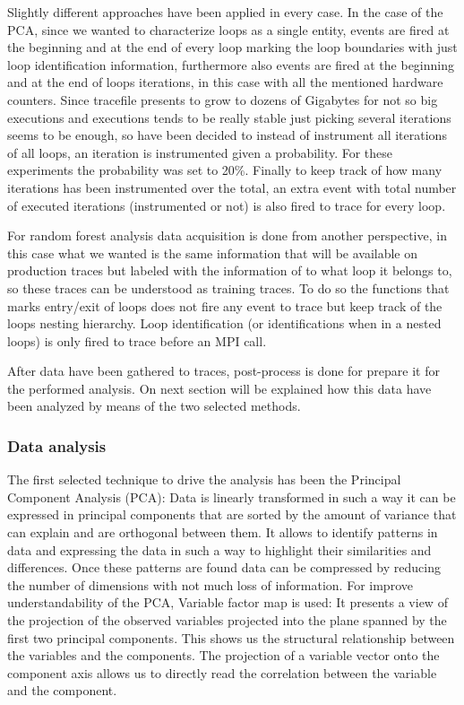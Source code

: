Slightly different approaches have been applied in every case. In the case of
the PCA, since we wanted to characterize loops as a single entity, events are
fired at the beginning and at the end of every loop marking the loop boundaries
with just loop identification information, furthermore also events are fired at 
the beginning and at the end of loops iterations, in this case with all the
mentioned hardware counters. Since tracefile presents to grow to dozens of
Gigabytes for not so big executions and executions tends to be really stable
just picking several iterations seems to be enough, so have been decided to 
instead of instrument all iterations of all loops, an iteration is instrumented 
given a probability. For these experiments the probability was set to 20\%.
Finally to keep track of how many iterations has been instrumented over the
total, an extra event with total number of executed iterations (instrumented or
not) is also fired to trace for every loop.

For random forest analysis data acquisition is done from another perspective, 
in this case what we wanted is the same information that will be available on
production traces but labeled with the information of to what loop it belongs
to, so these traces can be understood as training  traces. To do so the
functions that marks entry/exit of loops does not fire any event to trace but
keep track of the loops nesting hierarchy. Loop identification (or
identifications when in a nested loops) is only fired to trace before an MPI call. 

After data have been gathered to traces, post-process is done for
prepare it for the performed analysis. On next section will be explained 
how this data have been analyzed by means of the two selected methods. 

\subsubsection{Data analysis}

The first selected technique to drive the
analysis has been the Principal Component Analysis (PCA): Data is linearly 
transformed in such a way it can be expressed in principal components that are 
sorted by the amount of variance that can explain and are orthogonal between 
them. It allows to identify patterns in data and expressing the data in 
such a way to highlight their similarities and differences. Once these patterns 
are found data can be compressed by reducing the number of dimensions with not 
much loss of information.  For improve
understandability of the PCA, Variable factor map is used: It
presents a view of the projection of the observed variables projected into the
plane spanned by the first two principal components. This shows us the
structural relationship between the variables and the components. The projection
of a variable vector onto the component axis allows us to directly read the
correlation between the variable and the component.

